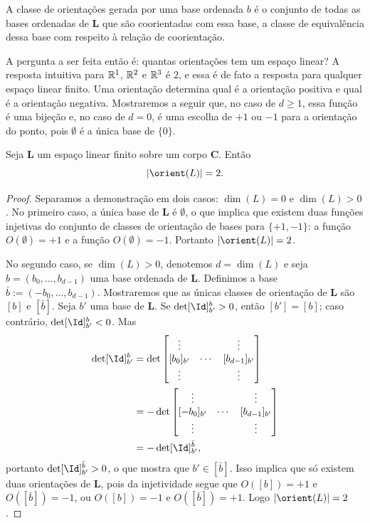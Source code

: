 A classe de orientações gerada por uma base ordenada $b$ é o conjunto de todas as bases ordenadas de $\bm L$ que são coorientadas com essa base, a classe de equivalência dessa base com respeito à relação de coorientação. 

A pergunta a ser feita então é: quantas orientações tem um espaço linear? A resposta intuitiva para $\mathbb{R}^1$, $\mathbb{R}^2$ e $\mathbb{R}^3$ é $2$, e essa é de fato a resposta para qualquer espaço linear finito. Uma orientação determina qual é a orientação positiva e qual é a orientação negativa. Mostraremos a seguir que, no caso de $d \geq 1$, essa função é uma bijeção e, no caso de $d=0$, é uma escolha de $+1$ ou $-1$ para a orientação do ponto, pois $\emptyset$ é a única base de $\{0\}$.

\begin{prop}
Seja $\bm L$ um espaço linear finito sobre um corpo $\bm C$. Então
	\begin{equation*}
	\card{\orient(L)} = 2.
	\end{equation*}
\end{prop}
\begin{proof}
Separamos a demonstração em dois casos: $\dim(L)=0$ e $\dim(L)>0$. No primeiro caso, a única base de $\bm L$ é $\emptyset$, o que implica que existem duas funções injetivas do conjunto de classes de orientação de bases para $\{+1,-1\}$: a função $O(\emptyset) = +1$ e a função $O(\emptyset) = -1$. Portanto $\card{\orient(L)}=2$.

No segundo caso, se $\dim(L)>0$, denotemos $d = \dim(L)$ e seja $b = (b_0,\ldots,b_{d-1})$ uma base ordenada de $\bm L$. Definimos a base $\bar b := (-b_0,\ldots,b_{d-1})$. Mostraremos que as únicas classes de orientação de $\bm L$ são $[b]$ e $[\bar b]$. Seja $b'$ uma base de $\bm L$. Se $\det [\Id]^b_{b'} > 0$, então $[b'] = [b]$; caso contrário, $\det [\Id]^b_{b'} < 0$. Mas
	\begin{align*}
	\det [\Id]^b_{b'} &= \det \begin{bmatrix}
	\vdots &   & \vdots \\ 
	[b_0]_{b'} & \cdots & [b_{d-1}]_{b'} \\ 
	\vdots &   & \vdots
	\end{bmatrix} \\
	&=	- \det \begin{bmatrix}
	\vdots &   & \vdots \\ 
	[-b_0]_{b'} & \cdots & [b_{d-1}]_{b'} \\ 
	\vdots &   & \vdots
	\end{bmatrix} \\
	&= -\det [\Id]^{\bar b}_{b'},
	\end{align*}
portanto $\det  [\Id]^{\bar b}_{b'} > 0$, o que mostra que $b' \in [\bar b]$. Isso implica que só existem duas orientações de $\bm L$, pois da injetividade segue que $O([b])=+1$ e $O([\bar b])=-1$, ou $O([b])=-1$ e $O([\bar b])=+1$. Logo $\card{\orient(L)}=2$.
\end{proof}


